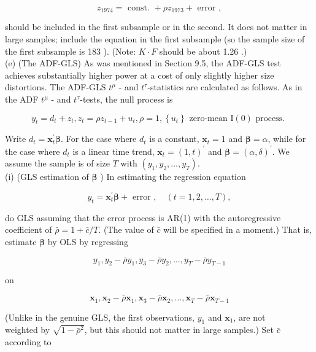 \documentclass[10pt]{article}
\begin{document}
$$
z_{1974}=\text { const. }+\rho z_{1973}+\text { error },
$$

should be included in the first subsample or in the second. It does not matter in large samples; include the equation in the first subsample (so the sample size of the first subsample is 183 ). (Note: $K \cdot F$ should be about 1.26 .)\\
(e) (The ADF-GLS) As was mentioned in Section 9.5, the ADF-GLS test achieves substantially higher power at a cost of only slightly higher size distortions. The ADF-GLS $t^{\mu}$ - and $t^{\tau}$-statistics are calculated as follows. As in the ADF $t^{\mu}$ - and $t^{\tau}$-tests, the null process is


\begin{equation*}
y_{t}=d_{t}+z_{t}, z_{t}=\rho z_{t-1}+u_{t}, \rho=1,\left\{u_{t}\right\} \text { zero-mean } \mathrm{I}(0) \text { process. } \tag{3}
\end{equation*}


Write $d_{t}=\mathbf{x}_{t}^{\prime} \boldsymbol{\beta}$. For the case where $d_{t}$ is a constant, $\mathbf{x}_{t}=1$ and $\boldsymbol{\beta}=\alpha$, while for the case where $d_{t}$ is a linear time trend, $\mathbf{x}_{t}=(1, t)^{\prime}$ and $\boldsymbol{\beta}=(\alpha, \delta)^{\prime}$. We assume the sample is of size $T$ with $\left(y_{1}, y_{2}, \ldots, y_{T}\right)$.\\
(i) (GLS estimation of $\boldsymbol{\beta}$ ) In estimating the regression equation


\begin{equation*}
y_{t}=\mathbf{x}_{t}^{\prime} \boldsymbol{\beta}+\text { error }, \quad(t=1,2, \ldots, T), \tag{4}
\end{equation*}


do GLS assuming that the error process is AR(1) with the autoregressive coefficient of $\bar{\rho}=1+\bar{c} / T$. (The value of $\bar{c}$ will be specified in a moment.) That is, estimate $\boldsymbol{\beta}$ by OLS by regressing

$$
y_{1}, y_{2}-\bar{\rho} y_{1}, y_{3}-\bar{\rho} y_{2}, \ldots, y_{T}-\bar{\rho} y_{T-1}
$$

on

$$
\mathbf{x}_{1}, \mathbf{x}_{2}-\bar{\rho} \mathbf{x}_{1}, \mathbf{x}_{3}-\bar{\rho} \mathbf{x}_{2}, \ldots, \mathbf{x}_{T}-\bar{\rho} \mathbf{x}_{T-1}
$$

(Unlike in the genuine GLS, the first observations, $y_{1}$ and $\mathbf{x}_{1}$, are not\\
weighted by $\sqrt{1-\bar{\rho}^{2}}$, but this should not matter in large samples.) Set $\bar{c}$ according to
\end{document}
